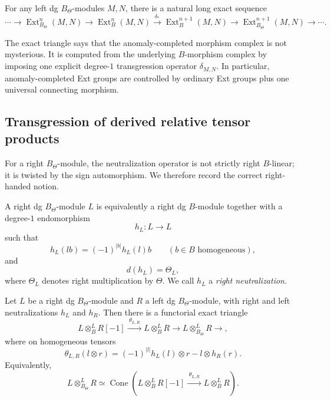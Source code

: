 \begin{corollary}
For any left dg \(B_{\Theta}\)-modules \(M,N\), there is a natural long exact sequence
\[
\cdots\to
\operatorname{Ext}^{n}_{B_{\Theta}}(M,N)
\to
\operatorname{Ext}^{n}_{B}(M,N)
\xrightarrow{\;\delta_{*}\;}
\operatorname{Ext}^{n+1}_{B}(M,N)
\to
\operatorname{Ext}^{n+1}_{B_{\Theta}}(M,N)
\to\cdots.
\]
\end{corollary}

\begin{remark}
The exact triangle says that the anomaly-completed morphism complex is not mysterious.
It is computed from the underlying \(B\)-morphism complex by imposing one explicit degree-\(1\) transgression operator \(\delta_{M,N}\).
In particular, anomaly-completed Ext groups are controlled by ordinary Ext groups plus one universal connecting morphism.
\end{remark}

\subsection{Transgression of derived relative tensor products}

For a right \(B_{\Theta}\)-module, the neutralization operator is not strictly right \(B\)-linear; it is twisted by the sign automorphism.
We therefore record the correct right-handed notion.

\begin{definition}
A right dg \(B_{\Theta}\)-module \(L\) is equivalently a right dg \(B\)-module together with a degree-\(1\) endomorphism
\[
h_{L}:L\longrightarrow L
\]
such that
\[
h_{L}(lb)=(-1)^{|b|}h_{L}(l)b
\qquad (b\in B \text{ homogeneous}),
\]
and
\[
d(h_{L})=\Theta_{L},
\]
where \(\Theta_{L}\) denotes right multiplication by \(\Theta\).
We call \(h_{L}\) a \emph{right neutralization}.
\end{definition}

\begin{theorem}
Let \(L\) be a right dg \(B_{\Theta}\)-module and \(R\) a left dg \(B_{\Theta}\)-module, with right and left neutralizations \(h_{L}\) and \(h_{R}\).
Then there is a functorial exact triangle
\[
L\otimes^{L}_{B}R[-1]
\xrightarrow{\;\theta_{L,R}\;}
L\otimes^{L}_{B}R
\longrightarrow
L\otimes^{L}_{B_{\Theta}}R
\longrightarrow ,
\]
where on homogeneous tensors
\[
\theta_{L,R}(l\otimes r)
=
(-1)^{|l|}h_{L}(l)\otimes r-l\otimes h_{R}(r).
\]
Equivalently,
\[
L\otimes^{L}_{B_{\Theta}}R
\simeq
\operatorname{Cone}\!\left(
L\otimes^{L}_{B}R[-1]
\xrightarrow{\;\theta_{L,R}\;}
L\otimes^{L}_{B}R
\right).
\]
\end{theorem}

